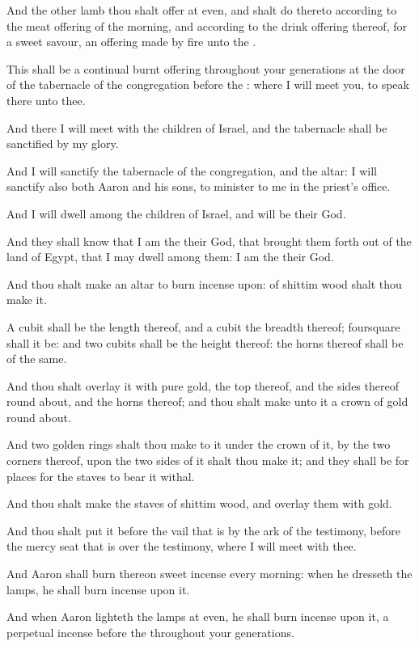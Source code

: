 \Verse And the other lamb thou shalt offer at even, and shalt do thereto according to the meat offering of the morning, and according to the drink offering thereof, for a sweet savour, an offering made by fire unto the \LORD.

\Verse This shall be a continual burnt offering throughout your generations at the door of the tabernacle of the congregation before the \LORD: where I will meet you, to speak there unto thee.

\Verse And there I will meet with the children of Israel, and the tabernacle shall be sanctified by my glory.

\Verse And I will sanctify the tabernacle of the congregation, and the altar: I will sanctify also both Aaron and his sons, to minister to me in the priest's office.

\Verse And I will dwell among the children of Israel, and will be their God.

\Verse And they shall know that I am the \LORD their God, that brought them forth out of the land of Egypt, that I may dwell among them: I am the \LORD their God.

\Chapter
\Verse And thou shalt make an altar to burn incense upon: of shittim wood shalt thou make it.

\Verse A cubit shall be the length thereof, and a cubit the breadth thereof; foursquare shall it be: and two cubits shall be the height thereof: the horns thereof shall be of the same.

\Verse And thou shalt overlay it with pure gold, the top thereof, and the sides thereof round about, and the horns thereof; and thou shalt make unto it a crown of gold round about.

\Verse And two golden rings shalt thou make to it under the crown of it, by the two corners thereof, upon the two sides of it shalt thou make it; and they shall be for places for the staves to bear it withal.

\Verse And thou shalt make the staves of shittim wood, and overlay them with gold.

\Verse And thou shalt put it before the vail that is by the ark of the testimony, before the mercy seat that is over the testimony, where I will meet with thee.

\Verse And Aaron shall burn thereon sweet incense every morning: when he dresseth the lamps, he shall burn incense upon it.

\Verse And when Aaron lighteth the lamps at even, he shall burn incense upon it, a perpetual incense before the \LORD throughout your generations.

